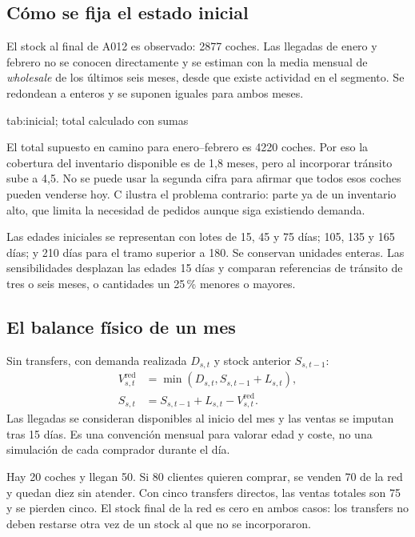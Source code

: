 \subsection{Cómo se fija el estado inicial}
El stock al final de A012 es observado: \num{2877} coches. Las llegadas de enero
y febrero no se conocen directamente y se estiman con la media mensual de
\emph{wholesale} de los últimos seis meses, desde que existe actividad en el
segmento. Se redondean a enteros y se suponen iguales para ambos meses.

{tab:inicial}{; total calculado con sumas}

El total supuesto en camino para enero--febrero es \num{4220} coches. Por eso la
cobertura del inventario disponible es de 1,8 meses, pero al incorporar tránsito
sube a 4,5. No se puede usar la segunda cifra para afirmar que todos esos coches
pueden venderse hoy. C ilustra el problema contrario: parte ya de un inventario
alto, que limita la necesidad de pedidos aunque siga existiendo demanda.

Las edades iniciales se representan con lotes de 15, 45 y 75 días; 105, 135 y
165 días; y 210 días para el tramo superior a 180. Se conservan unidades enteras.
Las sensibilidades desplazan las edades 15 días y comparan referencias de tránsito
de tres o seis meses, o cantidades un 25\,\% menores o mayores.

\subsection{El balance físico de un mes}
Sin transfers, con demanda realizada $D_{s,t}$ y stock anterior $S_{s,t-1}$:
\begin{align}
 V^{\mathrm{red}}_{s,t}&=\min(D_{s,t},S_{s,t-1}+L_{s,t}),\\
 S_{s,t}&=S_{s,t-1}+L_{s,t}-V^{\mathrm{red}}_{s,t}.
\end{align}
Las llegadas se consideran disponibles al inicio del mes y las ventas se imputan
tras 15 días. Es una convención mensual para valorar edad y coste, no una
simulación de cada comprador durante el día.

Hay 20 coches y llegan 50. Si 80 clientes quieren comprar, se venden 70 de la
red y quedan diez sin atender. Con cinco transfers directos, las ventas totales
son 75 y se pierden cinco. El stock final de la red es cero en ambos casos:
los transfers no deben restarse otra vez de un stock al que no se incorporaron.

